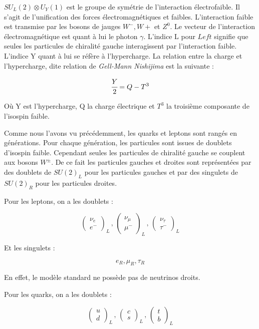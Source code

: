 \medskip

$SU_L(2) \otimes U_Y(1)$ est le groupe de sym\'etrie de l'interaction 
\'electrofaible. Il s'agit de l'unification des forces \'electromagn\'etiques et 
faibles. L'interaction faible est transmise par les bosons de jauges $W^-, W+$ 
et $Z^0$. Le vecteur de l'interaction \'electromagn\'etique est quant \`a lui 
le photon $\gamma$. L'indice L pour $Left$ signifie que seules les particules 
de chiralit\'e gauche interagissent par l'interaction faible. L'indice Y 
quant \`a lui se r\'ef\`ere \`a l'hypercharge.
La relation entre la charge et l'hypercharge, dite relation de \textit{Gell-Mann 
Nishijima} est la suivante :
 
\[ \cfrac{Y}{2} = Q - T^3 \]

O\`u Y est l'hypercharge, Q la charge \'electrique et $T^3$ la troisi\`eme 
composante de l'isospin faible.

\medskip

Comme nous l'avons vu pr\'ec\'edemment, les quarks et leptons sont rang\'es en 
g\'en\'erations. Pour chaque g\'en\'eration, les particules sont issues de 
doublets d'isospin faible. Cependant seules les particules de chiralit\'e 
gauche se couplent aux bosons $W^\pm$. De ce fait les particules gauches et 
droites sont repr\'esent\'ees par des doublets de $SU(2)_L$ pour les particules 
gauches et par des singulets de $SU(2)_R$ pour les particules droites.

\medskip

Pour les leptons, on a les doublets :

\[
\left( 
   \begin{array}{c}
      \nu_e \\
      e^-
   \end{array}
\right)_L
\, , \,
\left( 
   \begin{array}{c}
      \nu_\mu \\
      \mu^-
   \end{array}
\right)_L
\, , \,
\left( 
   \begin{array}{c}
      \nu_\tau \\
      \tau^-
   \end{array}
\right)_L
\]

Et les singulets :

\[ e_R, \mu_R, \tau_R \]

En effet, le mod\`ele standard ne poss\`ede pas de neutrinos droits.

Pour les quarks, on a les doublets :

\[
\left( 
   \begin{array}{c}
      u \\
      d
   \end{array}
\right)_L
\, , \,
\left( 
   \begin{array}{c}
      c \\
      s
   \end{array}
\right)_L
\, , \,
\left( 
   \begin{array}{c}
      t \\
      b
   \end{array}
\right)_L
\]

